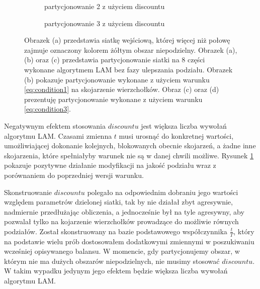 \begin{figure}[h]
\begin{subfigure}{.5\textwidth}
    \caption[short]{partycjonowanie 2 z użyciem discountu}
\end{subfigure}%
\begin{subfigure}{.5\textwidth}
    \centering
    \caption[short]{partycjonowanie 3 z użyciem discountu}
\end{subfigure}
\caption{Obrazek (a) przedstawia siatkę wejściową, której więcej niż połowę zajmuje oznaczony kolorem żółtym obszar niepodzielny.
Obrazek (a), (b) oraz (c) przedstawia partycjonowanie siatki na 8 części wykonane algorytmem LAM bez fazy ulepszania podziału.
Obrazek (b) pokazuje partycjonowanie wykonane z użyciem warunku \ref{eq:condition1} na skojarzenie wierzchołków.
Obraz (c) oraz (d) prezentuję partycjonowanie wykonane z użyciem warunku \ref{eq:condition3}.}
\label{im:discount}
\end{figure}

\newpage
Negatywnym efektem stosowania $discountu$ jest większa liczba wywołań algorytmu LAM.
Czasami zmienna $t$ musi urosnąć
do konkretnej wartości, umożliwiającej dokonanie kolejnych, blokowanych obecnie skojarzeń, a żadne inne skojarzenia,
które spełniałyby warunek nie są w danej chwili możliwe.
Rysunek \ref{im:discount} pokazuje pozytywne działanie modyfikacji na jakość podziału wraz z porównaniem do poprzedniej
wersji warunku.

Skonstruowanie $discountu$ polegało na odpowiednim dobraniu jego wartości względem parametrów dzielonej siatki, tak by
nie działał zbyt agresywnie, nadmiernie przedłużając obliczenia, a jednocześnie był na tyle agresywny, aby pozwalał tylko na
kojarzenie wierzchołków prowadzące do możliwie równych podziałów.
Został skonstruowany na bazie podstawowego współczynnika $\frac{t}{T}$, który na podstawie wielu prób
dostosowałem dodatkowymi zmiennymi w poszukiwaniu wcześniej opisywanego balansu.
W momencie, gdy partycjonujemy obszar, w którym nie ma dużych obszarów niepodzielnych, nie musimy stosować
$discountu$.
W takim wypadku jedynym jego efektem będzie większa liczba wywołań algorytmu LAM.


